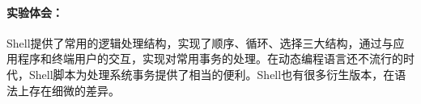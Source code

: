 \documentclass[cs4size,a4paper,nofonts]{ctexart}
\begin{document}
\paragraph{实验体会：}\quad

Shell提供了常用的逻辑处理结构，实现了顺序、循环、选择三大结构，通过与应用程序和终端用户的交互，实现对常用事务的处理。在动态编程语言还不流行的时代，Shell脚本为处理系统事务提供了相当的便利。Shell也有很多衍生版本，在语法上存在细微的差异。
\end{document}

